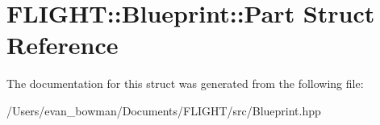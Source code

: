 \hypertarget{struct_f_l_i_g_h_t_1_1_blueprint_1_1_part}{}\section{F\+L\+I\+G\+HT\+:\+:Blueprint\+:\+:Part Struct Reference}
\label{struct_f_l_i_g_h_t_1_1_blueprint_1_1_part}


The documentation for this struct was generated from the following file\+:\begin{DoxyCompactItemize}
\item 
/\+Users/evan\+\_\+bowman/\+Documents/\+F\+L\+I\+G\+H\+T/src/Blueprint.\+hpp\end{DoxyCompactItemize}
